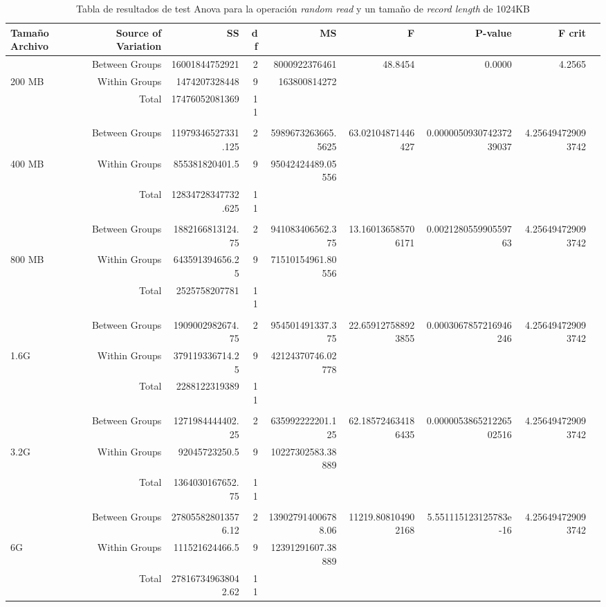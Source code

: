 \begin{landscape}
\begin{table}[!htp]\centering
\caption{Tabla de resultados de test Anova para la operación \textit{random read} y un tamaño de \textit{record length} de 1024KB}\label{tab: }
\scriptsize
\begin{tabular}{lrrrrrrrr}\toprule
Tamaño Archivo &Source of Variation &SS &df &MS &F &P-value &F crit \\\midrule
&Between Groups &16001844752921 &2 &8000922376461 &48.8454 &0.0000 &4.2565 \\
200 MB &Within Groups &1474207328448 &9 &163800814272 & & & \\
&Total &17476052081369 &11 & & & & \\
& & & & & & & \\
&Between Groups &11979346527331.125 &2 &5989673263665.5625 &63.02104871446427 &0.000005093074237239037 &4.256494729093742 \\
400 MB &Within Groups &855381820401.5 &9 &95042424489.05556 & & & \\
&Total &12834728347732.625 &11 & & & & \\
& & & & & & & \\
&Between Groups &1882166813124.75 &2 &941083406562.375 &13.160136585706171 &0.002128055990559763 &4.256494729093742 \\
800 MB &Within Groups &643591394656.25 &9 &71510154961.80556 & & & \\
&Total &2525758207781 &11 & & & & \\
& & & & & & & \\
&Between Groups &1909002982674.75 &2 &954501491337.375 &22.659127588923855 &0.0003067857216946246 &4.256494729093742 \\
1.6G &Within Groups &379119336714.25 &9 &42124370746.02778 & & & \\
&Total &2288122319389 &11 & & & & \\
& & & & & & & \\
&Between Groups &1271984444402.25 &2 &635992222201.125 &62.185724634186435 &0.000005386521226502516 &4.256494729093742 \\
3.2G &Within Groups &92045723250.5 &9 &10227302583.38889 & & & \\
&Total &1364030167652.75 &11 & & & & \\
& & & & & & & \\
&Between Groups &278055828013576.12 &2 &139027914006788.06 &11219.808104902168 &5.551115123125783e-16 &4.256494729093742 \\
6G &Within Groups &111521624466.5 &9 &12391291607.38889 & & & \\
&Total &278167349638042.62 &11 & & & & \\
\bottomrule
\end{tabular}
\end{table}
\end{landscape}

